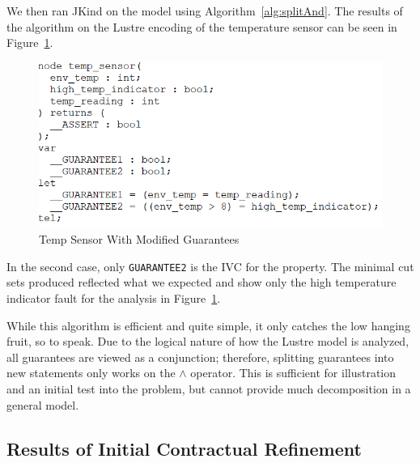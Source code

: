 We then ran JKind on the model using Algorithm~\ref{alg:splitAnd}. The results of the algorithm on the Lustre encoding of the temperature sensor can be seen in Figure~\ref{fig:lustreTwoGuar}. 

\begin{figure}[h!]
\begin{center}
\includegraphics[width=.8\textwidth]{images/lustreOneGuar.PNG}
\caption{Temp Sensor With Modified Guarantees} \label{fig:lustreTwoGuar}
\end{center}
\end{figure} 

 In the second case, only \texttt{GUARANTEE2} is the IVC for the property. The minimal cut sets produced reflected what we expected and show only the high temperature indicator fault for the analysis in Figure~\ref{fig:lustreTwoGuar}. 

While this algorithm is efficient and quite simple, it only catches the low hanging fruit, so to speak. Due to the logical nature of how the Lustre model is analyzed, all guarantees are viewed as a conjunction; therefore, splitting guarantees into new statements only works on the $\land$ operator. This is sufficient for illustration and an initial test into the problem, but cannot provide much decomposition in a general model. 

\subsection{Results of Initial Contractual Refinement}
\label{sec:resultsAND}
